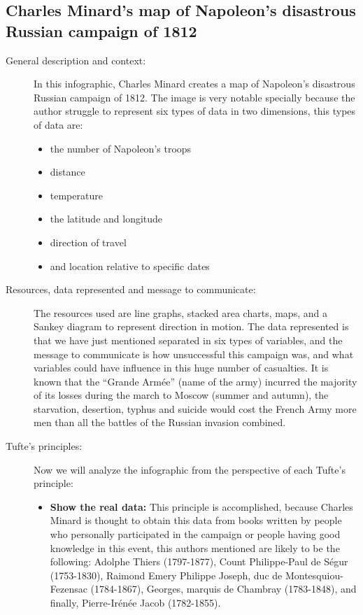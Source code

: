 \documentclass{article}
\begin{document}
\subsection{Charles Minard's map of Napoleon's disastrous Russian campaign of 1812}
  \begin{description}
    \item[General description and context:] In this infographic, Charles Minard creates a map of Napoleon's disastrous Russian campaign of 1812. The image is very notable specially because the author struggle to represent six types of data in two dimensions, this types of data are:
    \begin{itemize}
      \item the number of Napoleon's troops
      \item distance
      \item temperature
      \item the latitude and longitude
      \item direction of travel
      \item and location relative to specific dates
    \end{itemize}
    \item[Resources, data represented and message to communicate:] The resources used are line graphs, stacked area charts, maps, and a Sankey diagram to represent direction in motion. The data represented is that we have just mentioned separated in six types of variables, and the message to communicate is how unsuccessful this campaign was, and what variables could have influence in this huge number of casualties. It is known that the ``Grande Armée'' (name of the army) incurred the majority of its losses during the march to Moscow (summer and autumn), the starvation, desertion, typhus and suicide would cost the French Army more men than all the battles of the Russian invasion combined.
    \item[Tufte's principles:]Now we will analyze the infographic from the perspective of each Tufte's principle:
    \begin{itemize}
      \item \textbf{Show the real data:} This principle is accomplished, because Charles Minard is thought to obtain this data from books written by people who personally participated in the campaign or people having good knowledge in this event, this authors mentioned are likely to be the following: Adolphe Thiers (1797-1877), Count Philippe-Paul de Ségur (1753-1830), Raimond Emery Philippe Joseph, duc de Montesquiou-Fezensac (1784-1867), Georges, marquis de Chambray (1783-1848), and finally, Pierre-Irénée Jacob (1782-1855).

\end{itemize}
\end{description}
\end{document}

